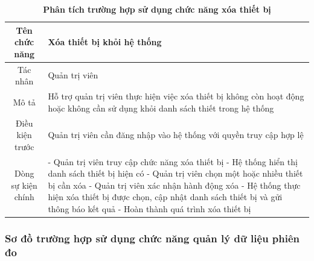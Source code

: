 \begin{table}[H]
	\caption{\bfseries \fontsize{12pt}{0pt}\selectfont Phân tích trường hợp sử dụng chức năng xóa thiết bị}
	\centering
	\begin{tabularx}{0.9\textwidth}{|c|X|}
		\hline
		\textbf{Tên chức năng} & \textbf{Xóa thiết bị khỏi hệ thống}                                                                                             \\
		\hline
		Tác nhân               & Quản trị viên                                                                                                                   \\
		\hline
		Mô tả                  & Hỗ trợ quản trị viên thực hiện việc xóa thiết bị không còn hoạt động hoặc không cần sử dụng khỏi danh sách thiết trong hệ thống \\
		\hline
		Điều kiện trước        & Quản trị viên cần đăng nhập vào hệ thống với quyền truy cập hợp lệ                                                              \\
		\hline
		Dòng sự kiện chính     &
		- Quản trị viên truy cập chức năng xóa thiết bị \newline
		- Hệ thống hiển thị danh sách thiết bị hiện có \newline
		- Quản trị viên chọn một hoặc nhiều thiết bị cần xóa \newline
		- Quản trị viên xác nhận hành động xóa \newline
		- Hệ thống thực hiện xóa thiết bị được chọn, cập nhật danh sách thiết bị và gửi thông báo kết quả \newline
		- Hoàn thành quá trình xóa thiết bị                                                                                                                      \\
		\hline
	\end{tabularx}
\end{table}

\subsubsection{Sơ đồ trường hợp sử dụng chức năng quản lý dữ liệu phiên đo}

